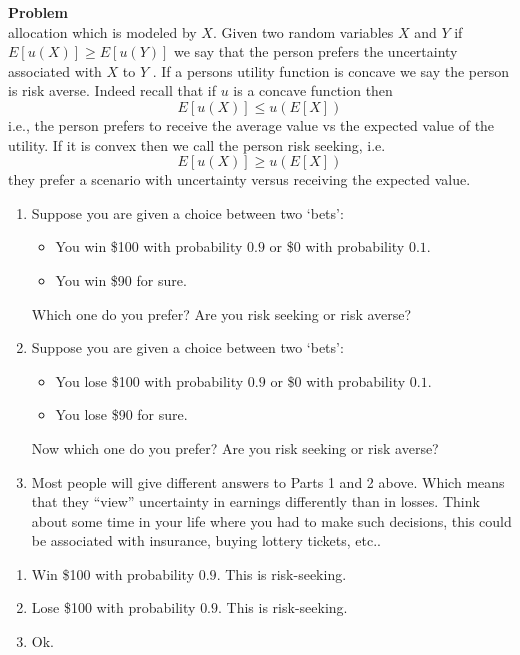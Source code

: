 \documentclass[12pt]{article}
\newenvironment{Ex}{\textbf{Problem}\vspace{.75em}\\}{}
\begin{document}
\begin{enumerate}
\begin{Ex}
      allocation which is modeled by $X$. Given two random variables $X$
      and $Y$ if $E [u(X)] \ge E [u(Y)]$ we say that the person prefers
      the uncertainty associated with $X$ to $Y$ . If a persons utility
      function is concave we say the person is risk averse. Indeed
      recall that if $u$ is a concave function then
      $$ E[u(X)] \le u(E[X]) $$
      i.e., the person prefers to receive the average value vs the
      expected value of the utility. If it is convex then we call the
      person risk seeking, i.e.
      $$ E[u(X)] \ge u(E[X]) $$
      they prefer a scenario with uncertainty versus receiving the expected value.
      \begin{enumerate}
      \item Suppose you are given a choice between two `bets':
        \begin{itemize}
        \item You win \$100 with probability $0.9$ or \$0 with
          probability $0.1$.
        \item You win \$90 for sure.
        \end{itemize}
        Which one do you prefer? Are you risk
        seeking or risk averse?
      \item Suppose you are given a choice
        between two `bets':
        \begin{itemize}
        \item You lose \$100 with probability $0.9$ or \$0 with
          probability $0.1$.
        \item You lose \$90 for sure.
        \end{itemize}
        Now which one do you prefer? Are you risk seeking or risk averse?
      \item Most people will give different answers to Parts 1 and 2
        above. Which means that they ``view'' uncertainty in earnings
        differently than in losses. Think about some time in your life
        where you had to make such decisions, this could be associated
        with insurance, buying lottery tickets, etc..
      \end{enumerate}
      \begin{solution} \hfill
        \begin{enumerate}
        \item Win \$100 with probability $0.9$. This is risk-seeking.
        \item Lose \$100 with probability $0.9$. This is risk-seeking.
        \item Ok.
        \end{enumerate}
      \end{solution}
    \end{Ex}
  \end{enumerate}
\end{document}
